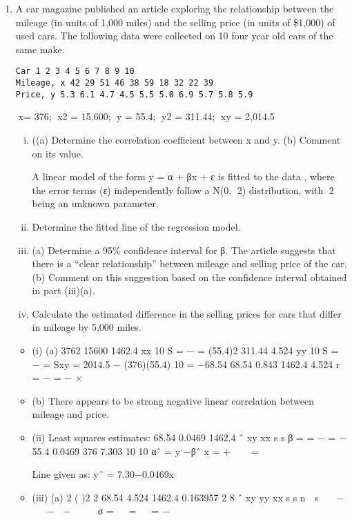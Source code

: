 \documentclass[a4paper,12pt]{article}
\begin{document}
\begin{enumerate}

\item A car magazine published an article exploring the relationship between the mileage
(in units of 1,000 miles) and the selling price (in units of \$1,000) of used cars. The
following data were collected on 10 four year old cars of the same make.
\begin{verbatim}
Car 1 2 3 4 5 6 7 8 9 10
Mileage, x 42 29 51 46 38 59 18 32 22 39
Price, y 5.3 6.1 4.7 4.5 5.5 5.0 6.9 5.7 5.8 5.9
\end{verbatim}
x= 376; x2 = 15,600; y = 55.4; y2 = 311.44; xy = 2,014.5
\begin{enumerate}[(i)]
\item ((a) Determine the correlation coefficient between x and y.
(b) Comment on its value.

A linear model of the form y = α + βx + ε is fitted to the data , where the error terms (ε) independently follow a N(0, 2) distribution, with 2 being an unknown
parameter.
\item  Determine the fitted line of the regression model. 
\item (a) Determine a 95\% confidence interval for β.
The article suggests that there is a “clear relationship” between mileage and
selling price of the car.
(b) Comment on this suggestion based on the confidence interval obtained in part (iii)(a).
\item Calculate the estimated difference in the selling prices for cars that differ in
mileage by 5,000 miles. 
\end{enumerate}



\begin{itemize}
\item (i) (a)
3762 15600 1462.4
xx 10 S = − =
  (55.4)2 311.44 4.524
yy 10 S = − =
  Sxy = 2014.5 − (376)(55.4)
10
= −68.54 
68.54 0.843
1462.4 4.524
r = − = −
×

\item (b) There appears to be strong negative linear correlation between mileage and price. 
\item (ii) Least squares estimates:
  68.54 0.0469
1462.4
ˆ xy
xx
s
s
β = = − = −
55.4 0.0469 376 7.303
10 10
αˆ = y −βˆ x = +   =
   

Line given as: yˆ = 7.30−0.0469x 
\item (iii) (a)
2 ( )2
2
68.54
4.524
1462.4
0.163957
2 8
ˆ
xy
yy
xx
s
s
n
 s   −   −  −    
σ =   =   =
  −


\end{itemize}
\end{enumerate}
\end{document}
